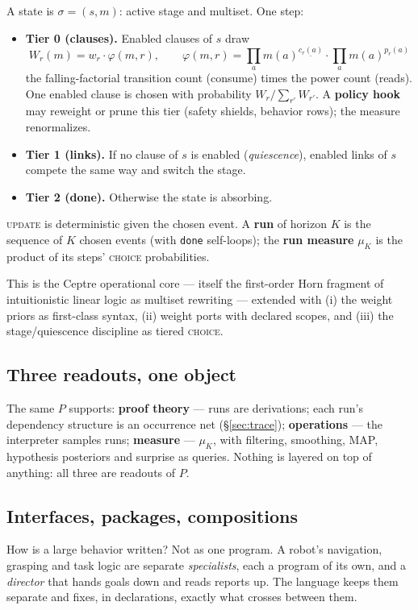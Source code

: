 \documentclass[11pt]{article}
\newcommand{\ff}[2]{#1^{\underline{#2}}}          %
\theoremstyle{plain}
\theoremstyle{definition}
\theoremstyle{remark}
\begin{document}
A state is $\sigma = (s, m)$: active stage and multiset. One step:
\begin{itemize}[leftmargin=2em]
\item \textbf{Tier 0 (clauses).} Enabled clauses of $s$ draw
  \[
    W_r(m) = w_r \cdot \varphi(m, r), \qquad
    \varphi(m, r) = \prod_a \ff{m(a)}{c_r(a)} \cdot \prod_a m(a)^{p_r(a)}
  \]
  the falling-factorial transition count (consume) times the power count
  (reads). One enabled clause is chosen with probability
  $W_r / \sum_{r'} W_{r'}$. A \textbf{policy hook} may reweight or prune
  this tier (safety shields, behavior rows); the measure renormalizes.
\item \textbf{Tier 1 (links).} If no clause of $s$ is enabled
  (\emph{quiescence}), enabled links of $s$ compete the same way and
  switch the stage.
\item \textbf{Tier 2 (done).} Otherwise the state is absorbing.
\end{itemize}
\textsc{update} is deterministic given the chosen event. A \textbf{run}
of horizon $K$ is the sequence of $K$ chosen events (with \texttt{done}
self-loops); the \textbf{run measure} $\mu_K$ is the product of its
steps' \textsc{choice} probabilities.

This is the Ceptre operational core \cite{Mar15} --- itself the
first-order Horn fragment of intuitionistic linear logic as multiset
rewriting \cite{CS09} --- extended with (i) the weight priors as
first-class syntax, (ii) weight ports with declared scopes, and (iii) the
stage/quiescence discipline as tiered \textsc{choice}.

\subsection{Three readouts, one object}

The same $P$ supports: \textbf{proof theory} --- runs are derivations;
each run's dependency structure is an occurrence net
(\S\ref{sec:trace}); \textbf{operations} --- the interpreter samples
runs; \textbf{measure} --- $\mu_K$, with filtering, smoothing, MAP,
hypothesis posteriors and surprise as queries. Nothing is layered on top
of anything: all three are readouts of $P$.

\subsection{Interfaces, packages, compositions}\label{sec:packages}

How is a large behavior written? Not as one program. A robot's
navigation, grasping and task logic are separate \emph{specialists},
each a program of its own, and a \emph{director} that hands goals down
and reads reports up. The language keeps them separate and fixes, in
declarations, exactly what crosses between them.
\end{document}
